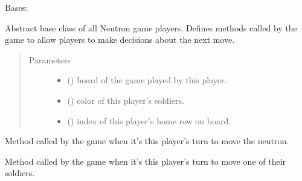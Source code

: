 \documentclass[letterpaper,10pt,english,openany,oneside]{sphinxmanual}
\begin{document}

\begin{fulllineitems}
\label{\detokenize{player:player.Player}}
Bases: 

Abstract base class of all Neutron game players. Defines methods called by
the game to allow players to make decisions about the next move.
\begin{quote}\begin{description}
\item[{Parameters}] \leavevmode\begin{itemize}
\item {} 
 ({\hyperref[\detokenize{neutron:neutron.NeutronBoard}]{}}) \textendash{} board of the game played by this player.

\item {} 
 () \textendash{} color of this player’s soldiers.

\item {} 
 () \textendash{} index of this player’s home row on board.

\end{itemize}

\end{description}\end{quote}

\begin{fulllineitems}
\label{\detokenize{player:player.Player.move_neutron}}
Method called by the game when it’s this player’s turn to move the
neutron.

\end{fulllineitems}


\begin{fulllineitems}
\label{\detokenize{player:player.Player.move_soldier}}
Method called by the game when it’s this player’s turn to move one of
their soldiers.

\end{fulllineitems}


\end{fulllineitems}
\end{document}
